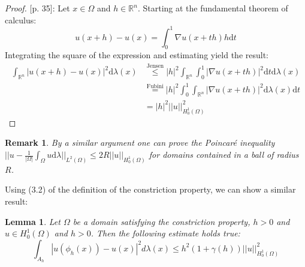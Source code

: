 \documentclass[11pt,a4paper,leqno]{report}
\newtheorem{lemma}[theorem]{Lemma}
\newtheorem{remark}[theorem]{Remark}
\numberwithin{equation}{chapter}
\begin{document}
\begin{proof}\cite{Haslinger}[p. 35]: Let $x\in\Omega$ and $h\in\mathbb{R}^n$. Starting at the fundamental theorem of calculus:
\begin{equation*} u(x+h)-u(x)=\int_0^1\nabla u(x+th)h\mathrm{d}t\end{equation*}
Integrating the square of the expression and estimating yield the result:
\begin{align*}
\int_{\mathbb{R}^n}|u(x+h)-u(x)|^2\mathrm{d}\lambda(x)&\overset{\text{Jensen}}{\leq} |h|^2\int_{\mathbb{R}^n}\int_0^1|\nabla u(x+th)|^2\mathrm{d}t\mathrm{d}\lambda(x)\\
&\overset{\text{Fubini}}{=}|h|^2\int_0^1\int_{\mathbb{R}^n}|\nabla u(x+th)|^2\mathrm{d}\lambda(x)\mathrm{d}t\\
&=|h|^2||u||_{H^1_0(\Omega)}^2
\end{align*}
\end{proof}
\begin{remark}By a similar argument one can prove the Poincar\'{e} inequality \\$||u-\frac{1}{|\Omega|}\int_\Omega u\mathrm{d}\lambda||_{L^2(\Omega)}\leq 2R||u||_{H^1_0(\Omega)}$ for domains contained in a ball of radius $R$.\end{remark}
Using (3.2) of the definition of the constriction property, we can show a similar result:
\begin{lemma}Let $\Omega$ be a domain satisfying the constriction property, $h>0$ and $u\in H^1_0(\Omega)$ and $h>0$. Then the following estimate holds true:
\begin{equation}\int_{A_h}|u(\phi_h(x))-u(x)|^2d\lambda(x)\leq h^2(1+\gamma(h))||u||_{H^1_0(\Omega)}^2\end{equation}
\end{lemma}
\end{document}
